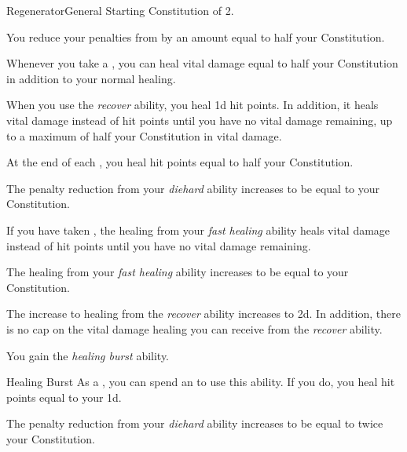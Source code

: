     \begin{feat}{Regenerator}{General}
        \featpre Starting Constitution of 2.

         You reduce your penalties from  by an amount equal to half your Constitution.

         Whenever you take a , you can heal vital damage equal to half your Constitution in addition to your normal healing.

         When you use the \textit{recover} ability, you heal \plus1d hit points.
        In addition, it heals vital damage instead of hit points until you have no vital damage remaining, up to a maximum of half your Constitution in vital damage.

         At the end of each , you heal hit points equal to half your Constitution.

         The penalty reduction from your \textit{diehard} ability increases to be equal to your Constitution.

         If you have taken , the healing from your \textit{fast healing} ability heals vital damage instead of hit points until you have no vital damage remaining.

         The healing from your \textit{fast healing} ability increases to be equal to your Constitution.

         The increase to healing from the \textit{recover} ability increases to \plus2d.
        In addition, there is no cap on the vital damage healing you can receive from the \textit{recover} ability.

         You gain the \textit{healing burst} ability.
        \begin{ability}{Healing Burst}
            As a , you can spend an  to use this ability.
            If you do, you heal hit points equal to your  \minus1d.
        \end{ability}

         The penalty reduction from your \textit{diehard} ability increases to be equal to twice your Constitution.
    \end{feat}

